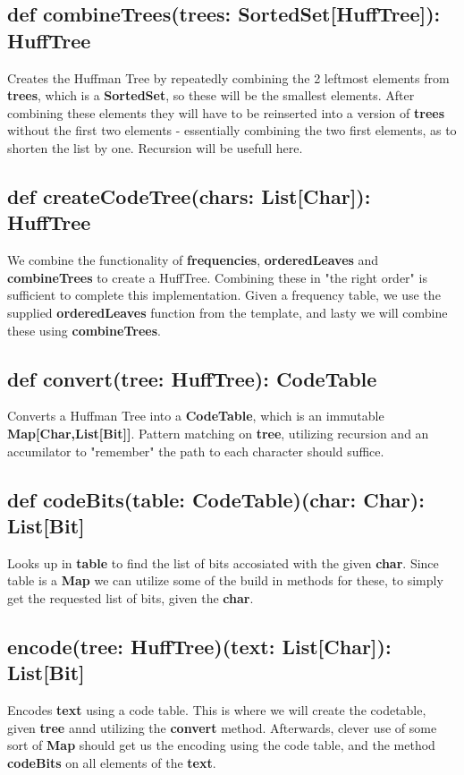 \documentclass{article}
\begin{document}
\subsection{def combineTrees(trees: SortedSet[HuffTree]): HuffTree}
Creates the Huffman Tree by repeatedly combining the 2 leftmost elements from \textbf{trees}, which is a \textbf{SortedSet}, so these will be the smallest elements. After combining these elements they will have to be reinserted into a version of \textbf{trees} without the first two elements - essentially combining the two first elements, as to shorten the list by one. Recursion will be usefull here.
\subsection{def createCodeTree(chars: List[Char]): HuffTree}
We combine the functionality of \textbf{frequencies}, \textbf{orderedLeaves} and \textbf{combineTrees} to create a HuffTree. Combining these in "the right order" is sufficient to complete this implementation. Given a frequency table, we use the supplied \textbf{orderedLeaves} function from the template, and lasty we will combine these using \textbf{combineTrees}.
\subsection{def convert(tree: HuffTree): CodeTable}
Converts a Huffman Tree into a \textbf{CodeTable}, which is an immutable \textbf{Map[Char,List[Bit]]}. Pattern matching on \textbf{tree}, utilizing recursion and an accumilator to "remember" the path to each character should suffice.
\subsection{def codeBits(table: CodeTable)(char: Char): List[Bit]}
Looks up in \textbf{table} to find the list of bits accosiated with the given \textbf{char}. Since table is a \textbf{Map} we can utilize some of the build in methods for these, to simply get the requested list of bits, given the \textbf{char}.
\subsection{encode(tree: HuffTree)(text: List[Char]): List[Bit]}
Encodes \textbf{text} using a code table. This is where we will create the codetable, given \textbf{tree} annd utilizing the \textbf{convert} method. Afterwards, clever use of some sort of \textbf{Map} should get us the encoding using the code table, and the method \textbf{codeBits} on all elements of the \textbf{text}.
\end{document}
